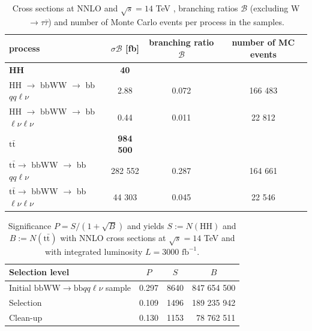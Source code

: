 \documentclass[10pt,a4paper]{article}
\newcommand{\cc}[1]{\multicolumn{1}{c}{#1}} %
\renewcommand{\H}{\text{H}}
\renewcommand{\tt}{\ensuremath{\text{t}\bar{\text{t}}}}
\newcommand{\di}{$\rightarrow$ bbWW $\rightarrow$ bb$\ell\nu \ell\nu$}
\newcommand{\semi}{$\rightarrow$ bbWW $\rightarrow$ bb$qq\ell\nu$}
\newcommand{\sAN}{$\sigma_1$}
\newcommand{\BR}{\mathcal{B}}
\begin{document}
\begin{table}[h]
	\centering
	\caption{Cross sections at NNLO and $\sqrt{s}=14$ TeV \cite{sigma_HH}\cite{sigma_tt}, branching ratios $\BR$ (excluding W $\rightarrow \tau\bar{\tau}$) \cite{BR_HH}\cite{BR_tt}\cite{BR_W} and number of Monte Carlo events per process in the samples.} %
	\label{sigma}
	\begin{tabular}{@{\;}lccc@{\;}}
	\toprule
	process      & $\sigma\BR$ [fb] & branching ratio $\BR$ & number of MC events \\
	\midrule
	\textbf{HH}  & \textbf{40}      &           & \\ %
	HH \semi     &        2.88      &   0.072   &  166 483  \\
	HH \di       &        0.44      &   0.011   &   22 812  \\
	\textbf{\tt} & \textbf{984 500} &           & \\ %
	\tt \semi    &     282 552      &   0.287   &  164 661  \\
	\tt \di      &      44 303      &   0.045   &   22 546  \\
	\bottomrule
	\end{tabular}
\end{table}



\begin{table}[h]
	\centering
	\caption{Significance $P=S/(1+\sqrt{B})$ and yields $S:=N(\H\H)$ and $B:=N(\tt)$ with NNLO cross sections at $\sqrt{s}=14$ TeV and with integrated luminosity $L = 3000 \text{ fb}^{-1}$.} %
	\begin{tabular}{@{\;}lrrr@{\;}}
	
	\toprule
	Selection level & \cc{$P$} & \cc{$S$} & \cc{$B$} \\
	\midrule
	Initial $\text{bbWW} \rightarrow \text{bb}qq\ell\nu$ sample
		& 0.297 &   8640  & 847 654 500  \\
	Selection
 		& 0.109 &   1496  & 189 235 942  \\
	Clean-up
 		& 0.130 &   1153  &  78 762 511  \\
	\bottomrule
	
	\end{tabular}
\end{table}
\end{document}
